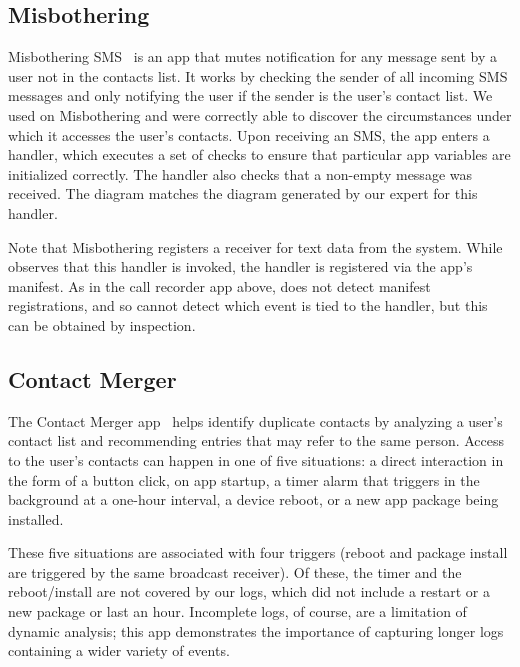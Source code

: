 \subsection{Misbothering}

Misbothering SMS~\cite{misbothering} is an app that mutes notification for any message
sent by a user not in the contacts list. It works by checking the
sender of all incoming SMS messages and only notifying the user if the
sender is the user's contact list. We used \hogarth{} on Misbothering
and were correctly able to discover the circumstances under which it
accesses the user's contacts. Upon receiving an SMS, the app enters a 
handler, which executes a set of checks to ensure that particular app variables 
are initialized correctly. The handler also checks that a non-empty 
message was received. The \hogarth{} diagram matches the diagram 
generated by our expert for this handler.

Note that Misbothering registers a receiver for text data from the
system. While \hogarth{} observes that this handler is invoked, the 
handler is registered via the app's manifest. As in the call recorder app 
above, \hogarth{} does not detect manifest registrations, and so cannot 
detect which event is tied to the handler, but this can be obtained 
by inspection. 

\subsection{Contact Merger}

The Contact Merger app~\cite{contactmerger} helps identify duplicate contacts by analyzing
a user's contact list and recommending entries that may refer to
the same person. Access to the user's contacts can happen in one of five situations:
a direct interaction in the form of a button click, on app startup, a timer alarm that
triggers in the background at a one-hour interval, a device reboot, or a
new app package being installed.

These five situations are associated with four triggers (reboot and package install 
are triggered by the same broadcast receiver). Of these, the timer and the 
reboot/install are not covered by our logs, which did 
not include a restart or a new package or last an hour. Incomplete logs, 
of course, are a limitation of dynamic analysis; this app demonstrates the 
importance of capturing longer logs containing a wider variety of events. 

